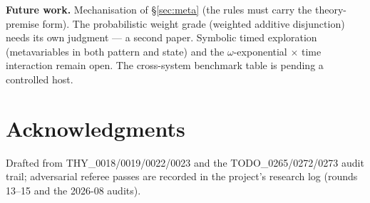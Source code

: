 \documentclass[11pt]{article}
\theoremstyle{definition}
\theoremstyle{remark}
\begin{document}
\medskip
\noindent\textbf{Future work.}  Mechanisation of \S\ref{sec:meta} (the rules
must carry the theory-premise form).  The probabilistic weight grade (weighted
additive disjunction) needs its own judgment --- a second paper.  Symbolic timed
exploration (metavariables in both pattern and state) and the $\omega$-exponential
$\times$ time interaction remain open.  The cross-system benchmark table is
pending a controlled host.

\section*{Acknowledgments}

Drafted from THY\_0018/0019/0022/0023 and the TODO\_0265/0272/0273 audit trail;
adversarial referee passes are recorded in the project's research log (rounds
13--15 and the 2026-08 audits).



\end{document}
